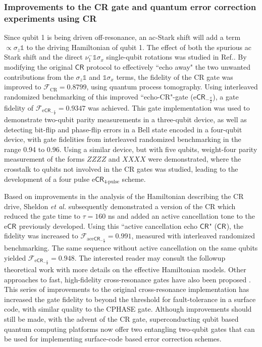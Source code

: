 \documentclass[aip,apr,twocolumn,showpacs,superscriptaddress,groupedaddress,nofootinbib,reprint]{revtex4-1}  %
\newcommand{\Id}{\mathds{1}}
\newcommand{\CPHASE}{\textsf{CPHASE}}
\newcommand{\ZX}[1]{\textsf{CR}_{#1}}
\newcommand{\CR}{\textsf{CR}}
\newcommand{\etal}{\emph{et al.}}
\begin{document}
\subsubsection{Improvements to the \CR{} gate and quantum error correction experiments using \CR{}}\label{subsubsec:CRforQEC}
Since qubit 1 is being driven off-resonance, an ac-Stark shift will add a term $\propto \sigma_z \Id$ to the driving Hamiltonian of qubit 1. The effect of both the spurious ac Stark shift and the direct $\nu_1^-\Id\sigma_x$ single-qubit rotations was studied in Ref.. By modifying the original $\CR{}$ protocol to effectively ``echo away" the two unwanted contributions from the $\sigma_z\Id$ and $\Id\sigma_x$ terms, the fidelity of the \CR{} gate was improved to $\mathcal F_\text{CR} = 0.8799$\cite{Corcoles2013}, using quantum process tomography. Using interleaved randomized benchmarking of this improved ``echo-CR"-gate (e$\ZX{-\frac{\pi}{2}}$), a gate fidelity of $\mathcal F_{\text{e}\ZX{-\frac{\pi}{2}}} = 0.9347$ was achieved. This gate implementation was used to demonstrate two-qubit parity measurements in a three-qubit device\cite{Chow2014}, as well as detecting bit-flip and phase-flip errors in a Bell state encoded in a four-qubit device\cite{Corcoles2015}, with gate fidelities from interleaved randomized benchmarking in the range 0.94 to 0.96. Using a similar device, but with five qubits, weight-four parity measurement of the forms $ZZZZ$ and $XXXX$ were demonstrated\cite{Takita2016}, where the crosstalk to qubits not involved in the \CR{} gates was studied, leading to the development of a four pulse $\text{e}\CR_{\text{4-pulse}}$ scheme.

Based on improvements in the analysis of the Hamiltonian describing the \CR{} drive, Sheldon \etal{}\cite{Sheldon2016} subsequently demonstrated a version of the \CR{} which reduced the gate time to $\tau = 160$ ns and added an active cancellation tone to the e$\ZX{}$ previously developed. Using this ``active cancellation echo $\ZX{}$" ($\ZX{}$), the fidelity was increased to $\mathcal F_{\text{ace}\ZX{-\frac{\pi}{2}}} = 0.991$, measured with interleaved randomized benchmarking. The same sequence without active cancellation on the same qubits yielded $\mathcal F_{\text{e}\ZX{-\frac{\pi}{2}}} = 0.948$. The interested reader may consult the followup theoretical work \cite{Magesan2018} with more details on the effective Hamiltonian models. Other approaches to fast, high-fidelity cross-resonance gates have also been proposed \cite{Kirchhoff2018}. This series of improvements to the original cross-resonance implementation has increased the gate fidelity to beyond the threshold for fault-tolerance in a surface code, with similar quality to the \CPHASE{} gate. Although improvements should still be made, with the advent of the \CR{} gate, superconducting qubit based quantum computing platforms now offer two entangling two-qubit gates that can be used for implementing surface-code based error correction schemes.
\end{document}
